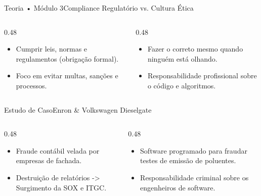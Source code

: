\begin{senaiframe}{Teoria • Módulo 3}{Compliance Regulatório vs. Cultura Ética}
  \begin{columns}[t]
    \begin{column}{0.48\textwidth}
      \begin{tcolorbox}[senaicard, title={Compliance Regulatório}]
        \begin{itemize}
          \item Cumprir leis, normas e regulamentos (obrigação formal).
          \item Foco em evitar multas, sanções e processos.
        \end{itemize}
      \end{tcolorbox}
    \end{column}
    \begin{column}{0.48\textwidth}
      \begin{tcolorbox}[senaigreencard, title={Cultura Ética \& Integridade}]
        \begin{itemize}
          \item Fazer o correto mesmo quando ninguém está olhando.
          \item Responsabilidade profissional sobre o código e algoritmos.
        \end{itemize}
      \end{tcolorbox}
    \end{column}
  \end{columns}
\end{senaiframe}

\begin{senaiframe}{Estudo de Caso}{Enron \& Volkswagen Dieselgate}
  \begin{columns}[t]
    \begin{column}{0.48\textwidth}
      \begin{tcolorbox}[senairedcard, title={Caso Enron (Falha de Controle)}]
        \begin{itemize}
          \item Fraude contábil velada por empresas de fachada.
          \item Destruição de relatórios -> Surgimento da SOX e ITGC.
        \end{itemize}
      \end{tcolorbox}
    \end{column}
    \begin{column}{0.48\textwidth}
      \begin{tcolorbox}[senaiambercard, title={Caso Dieselgate (Dilema Ético)}]
        \begin{itemize}
          \item Software programado para fraudar testes de emissão de poluentes.
          \item Responsabilidade criminal sobre os engenheiros de software.
        \end{itemize}
      \end{tcolorbox}
    \end{column}
  \end{columns}
\end{senaiframe}

